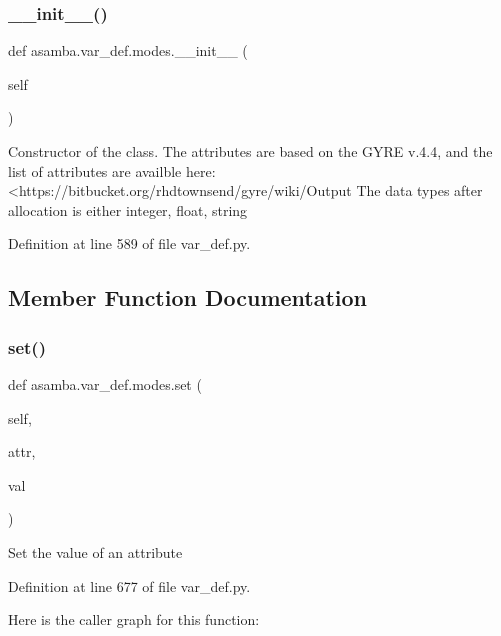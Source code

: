 \subsubsection{\texorpdfstring{\+\_\+\+\_\+init\+\_\+\+\_\+()}{\_\_init\_\_()}}
{\footnotesize\ttfamily def asamba.\+var\+\_\+def.\+modes.\+\_\+\+\_\+init\+\_\+\+\_\+ (\begin{DoxyParamCaption}\item[{}]{self }\end{DoxyParamCaption})}

\begin{DoxyVerb}Constructor of the class. The attributes are based on the GYRE v.4.4, and the list of attributes 
are availble here: <https://bitbucket.org/rhdtownsend/gyre/wiki/Output%
The data types after allocation is either integer, float, string
\end{DoxyVerb}
 

Definition at line 589 of file var\+\_\+def.\+py.



\subsection{Member Function Documentation}
\mbox{\label{classasamba_1_1var__def_1_1modes_a68e3175f54a123a371a9e5345b2cfe6e}} 
\subsubsection{\texorpdfstring{set()}{set()}}
{\footnotesize\ttfamily def asamba.\+var\+\_\+def.\+modes.\+set (\begin{DoxyParamCaption}\item[{}]{self,  }\item[{}]{attr,  }\item[{}]{val }\end{DoxyParamCaption})}

\begin{DoxyVerb}Set the value of an attribute
\end{DoxyVerb}
 

Definition at line 677 of file var\+\_\+def.\+py.

Here is the caller graph for this function\+:
\mbox{\label{classasamba_1_1var__def_1_1modes_a2d9b87e9cdfe54142627a502476bb868}} 
